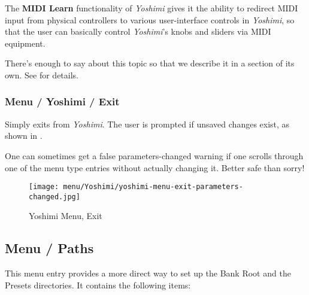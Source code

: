    The \textbf{MIDI Learn} functionality of \textsl{Yoshimi} gives it the
   ability to redirect MIDI input from physical controllers to various
   user-interface controls in \textsl{Yoshimi}, so that the user can basically
   control \textsl{Yoshimi}'s knobs and sliders via MIDI equipment.

   There's enough to say about this topic so that we describe it in a section
   of its own.
   See  for details.

\subsubsection{Menu / Yoshimi / Exit}
\label{subsubsec:menu_yoshimi_exit}

   Simply exits from \textsl{Yoshimi}.
   The user is prompted if unsaved changes exist, as shown in
   .

   One can sometimes get a false parameters-changed warning if one
   scrolls through one of the menu type entries without actually changing it.
   Better safe than sorry!

\begin{figure}[H]
   \centering 
   \texttt{[image: menu/Yoshimi/yoshimi-menu-exit-parameters-changed.jpg]}
   \caption[Yoshimi Menu, Exit]{Yoshimi Menu, Exit}
   \label{fig:yoshimi_change_exit}
\end{figure}

%
% 





%

\subsection{Menu / Paths}
\label{subsec:menu_paths}

   This menu entry provides a more direct way to set up the Bank Root and
   the Presets directories.  It contains the following items:

